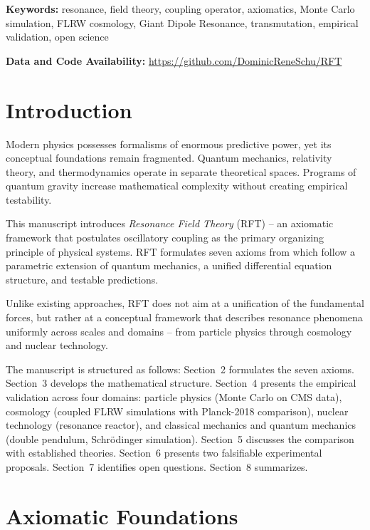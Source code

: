 \documentclass[12pt]{iopart}
\begin{document}
	\noindent\textbf{Keywords:} resonance, field theory,
	coupling operator, axiomatics, Monte Carlo simulation,
	FLRW cosmology, Giant Dipole Resonance, transmutation,
	empirical validation, open science
	
	\medskip
	
	\noindent\textbf{Data and Code Availability:}
	\url{https://github.com/DominicReneSchu/RFT}
	
	
	\section{Introduction}
	
	Modern physics possesses formalisms of enormous predictive
	power, yet its conceptual foundations remain fragmented.
	Quantum mechanics, relativity theory, and thermodynamics
	operate in separate theoretical spaces. Programs of quantum
	gravity increase mathematical complexity without creating
	empirical testability.
	
	This manuscript introduces \textit{Resonance Field Theory}
	(RFT) -- an axiomatic framework that postulates oscillatory
	coupling as the primary organizing principle of physical
	systems. RFT formulates seven axioms from which follow a
	parametric extension of quantum mechanics, a unified
	differential equation structure, and testable predictions.
	
	Unlike existing approaches, RFT does not aim at a
	unification of the fundamental forces, but rather at a
	conceptual framework that describes resonance phenomena
	uniformly across scales and domains -- from particle physics
	through cosmology and nuclear technology.
	
	The manuscript is structured as follows: Section~2
	formulates the seven axioms. Section~3 develops the
	mathematical structure. Section~4 presents the empirical
	validation across four domains: particle physics (Monte
	Carlo on CMS data), cosmology (coupled FLRW simulations
	with Planck-2018 comparison), nuclear technology (resonance
	reactor), and classical mechanics and quantum mechanics
	(double pendulum, Schrödinger simulation). Section~5
	discusses the comparison with established theories.
	Section~6 presents two falsifiable experimental proposals.
	Section~7 identifies open questions. Section~8 summarizes.
	
	
	\section{Axiomatic Foundations}
	
\end{document}
